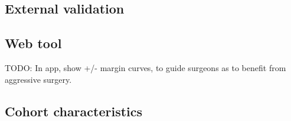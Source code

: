 \documentclass[dissertation.tex]{subfiles}
\begin{document}

\subsection{External validation}

\subsection{Web tool}


%

TODO: In app, show +/- margin curves, to guide surgeons as to benefit from aggressive surgery.


\subsection{Cohort characteristics}
\label{subsec:nomo-results-cohort}
\end{document}
